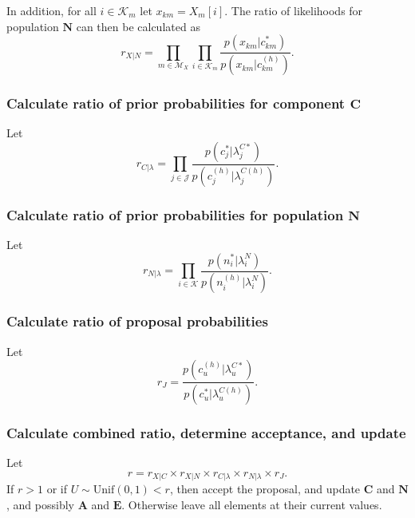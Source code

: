\documentclass{article}
\begin{document}
In addition, for all $i \in \mathcal{K}_m$ let $x_{km} = X_m[i]$.  The ratio of likelihoods for population $\bm{N}$ can then be calculated as
\begin{equation}
  r_{X|N} = \prod_{m \in \mathcal{M}_X} \prod_{i \in \mathcal{K}_m} \frac{ p(x_{km} | c_{km}^*) }{ p(x_{km} | c_{km}^{(h)}) }.
\end{equation}


\subsubsection{Calculate ratio of prior probabilities for component $\bm{C}$}

Let
\begin{equation}
  r_{C|\lambda} =  \prod_{j \in \mathcal{J}} \frac{ p(c_j^* | \lambda_j^{C*}) }{ p(c_j^{(h)} | \lambda_j^{C(h)}) }.
\end{equation}

\subsubsection{Calculate ratio of prior probabilities for population $\bm{N}$}

Let
\begin{equation}
  r_{N|\lambda} =  \prod_{i \in \mathcal{K}} \frac{ p(n_i^* | \lambda_i^N) }{ p(n_i^{(h)} | \lambda_i^N) }.
\end{equation}


\subsubsection{Calculate ratio of proposal probabilities}

Let
\begin{equation}
  r_J =  \frac{ p(c_u^{(h)} | \lambda_u^{C*}) }{ p(c_u^* | \lambda_u^{C(h)}) }.
\end{equation}


\subsubsection{Calculate combined ratio, determine acceptance, and update}

Let
\begin{equation}
  r =  r_{X|C} \times r_{X|N} \times r_{C|\lambda} \times r_{N|\lambda} \times r_J.
\end{equation}
If $r > 1$ or if $U \sim \text{Unif}(0,1) < r$, then accept the proposal, and update $\bm{C}$ and $\bm{N}$, and possibly $\bm{A}$ and $\bm{E}$.  Otherwise leave all elements at their current values.
\end{document}
